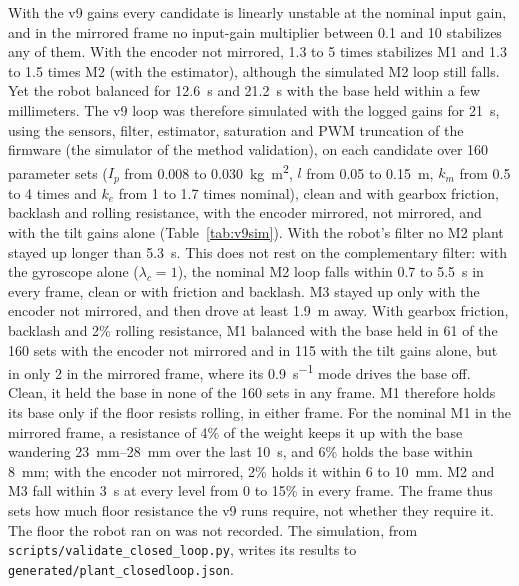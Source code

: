 With the v9 gains every candidate is linearly unstable at the nominal input
gain, and in the mirrored frame no input-gain multiplier between 0.1 and 10
stabilizes any of them. With the encoder not mirrored, 1.3 to 5 times
stabilizes M1 and 1.3 to 1.5 times M2 (with the estimator), although the
simulated M2 loop still falls. Yet the robot balanced
for \SI{12.6}{s} and \SI{21.2}{s} with the base held within a few millimeters.
The v9 loop was therefore simulated with the logged gains for \SI{21}{s}, using
the sensors, filter, estimator, saturation and PWM truncation of the firmware
(the simulator of the method validation), on each candidate over 160 parameter
sets ($I_p$ from 0.008 to \SI{0.030}{kg.m^2}, $l$ from 0.05 to \SI{0.15}{m},
$k_m$ from 0.5 to 4 times and $k_e$ from 1 to 1.7 times nominal), clean and
with gearbox friction, backlash and rolling resistance, with the encoder
mirrored, not mirrored, and with the tilt gains alone
(Table~\ref{tab:v9sim}). With the robot's filter no M2 plant stayed up longer
than \SI{5.3}{s}. This does not rest on the complementary filter: with the gyroscope alone
($\lambda_c=1$), the nominal M2 loop falls within 0.7 to \SI{5.5}{s} in every
frame, clean or with friction and backlash. M3 stayed up only with the encoder
not mirrored, and then drove at least \SI{1.9}{m} away. With gearbox friction,
backlash and 2\% rolling resistance, M1 balanced with the base held in 61 of
the 160 sets with the encoder not mirrored and in 115 with the tilt gains
alone, but in only 2 in the mirrored frame, where its \SI{0.9}{s^{-1}} mode
drives the base off. Clean, it held the base in none of the 160 sets in any
frame. M1 therefore holds its base only if the floor resists rolling, in
either frame. For the nominal M1 in the mirrored frame, a resistance of 4\% of
the weight keeps it up with the base wandering \SIrange{23}{28}{mm} over the
last \SI{10}{s}, and 6\% holds the base within \SI{8}{mm}; with the encoder not
mirrored, 2\% holds it within 6 to \SI{10}{mm}. M2 and M3 fall within \SI{3}{s} at
every level from 0 to 15\% in every frame. The frame thus sets how much floor
resistance the v9 runs require, not whether they require it. The floor the
robot ran on was not recorded. The simulation, from
\texttt{scripts/validate\_closed\_loop.py}, writes its results to
\texttt{generated/plant\_closedloop.json}.

